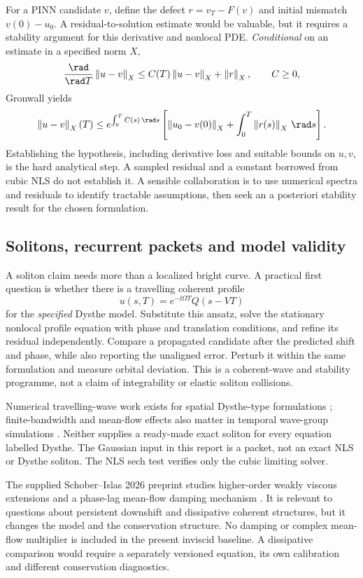 For a PINN candidate $v$, define the defect $r=v_T-F(v)$ and initial mismatch $v(0)-u_0$. A residual-to-solution estimate would be valuable, but it requires a stability argument for this derivative and nonlocal PDE. \emph{Conditional} on an estimate in a specified norm $X$,
\[
 \frac{\rad}{\rad T}\norm{u-v}_X\le C(T)\norm{u-v}_X+\norm{r}_X,
 \qquad C\ge0,
\]
Gronwall yields
\[
 \norm{u-v}_X(T)\le e^{\int_0^T C(s)\,\rad s}
 \left[\norm{u_0-v(0)}_X+\int_0^T\norm{r(s)}_X\,\rad s\right].
\]
Establishing the hypothesis, including derivative loss and suitable bounds on $u,v$, is the hard analytical step. A sampled residual and a constant borrowed from cubic NLS do not establish it. A sensible collaboration is to use numerical spectra and residuals to identify tractable assumptions, then seek an a posteriori stability result for the chosen formulation.
\clearpage
\subsection{Solitons, recurrent packets and model validity}
A soliton claim needs more than a localized bright curve. A practical first question is whether there is a travelling coherent profile
\[
 u(s,T)=e^{-\ii\Omega T}Q(s-VT)
\]
for the \emph{specified} Dysthe model. Substitute this ansatz, solve the stationary nonlocal profile equation with phase and translation conditions, and refine its residual independently. Compare a propagated candidate after the predicted shift and phase, while also reporting the unaligned error. Perturb it within the same formulation and measure orbital deviation. This is a coherent-wave and stability programme, not a claim of integrability or elastic soliton collisions.

Numerical travelling-wave work exists for spatial Dysthe-type formulations \cite{fedele}; finite-bandwidth and mean-flow effects also matter in temporal wave-group simulations \cite{shemer}. Neither supplies a ready-made exact soliton for every equation labelled Dysthe. The Gaussian input in this report is a packet, not an exact NLS or Dysthe soliton. The NLS sech test verifies only the cubic limiting solver.

The supplied Schober--Islas 2026 preprint studies higher-order weakly viscous extensions and a phase-lag mean-flow damping mechanism \cite{schober}. It is relevant to questions about persistent downshift and dissipative coherent structures, but it changes the model and the conservation structure. No damping or complex mean-flow multiplier is included in the present inviscid baseline. A dissipative comparison would require a separately versioned equation, its own calibration and different conservation diagnostics.

